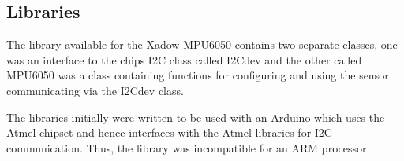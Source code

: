 
\subsection{Libraries}

The library available for the Xadow MPU6050 contains two separate classes, one was an interface to the chips I2C class called I2Cdev and the other called MPU6050 was a class containing functions for configuring and using the sensor communicating via the I2Cdev class. 

The libraries initially were written to be used with an Arduino which uses the Atmel chipset and hence interfaces with the Atmel libraries for I2C communication. Thus, the library was incompatible for an ARM processor. 


